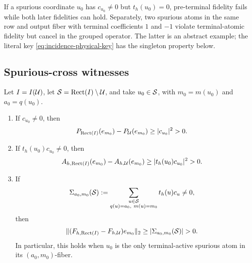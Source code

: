 \begin{example}
\label{ex:incidence-strict-hierarchy}
If a spurious coordinate \(u_0\) has \(c_{u_0}\ne0\) but
\(t_h(u_0)=0\), pre-terminal fidelity fails while both later fidelities can
hold.  Separately, two spurious atoms in the same row and output fiber with
terminal coefficients \(1\) and \(-1\) violate terminal-atomic fidelity
but cancel in the grouped operator.  The latter is an abstract example;
the literal key \eqref{eq:incidence-physical-key} has the singleton
property below.
\end{example}

\subsection{Spurious-cross witnesses}

\begin{proposition}
\label{prop:incidence-spurious-cross-witness}
Let \(I=I(\mathcal U)\), let \(\mathcal S=\operatorname{Rect}(I)\setminus\mathcal U\), and take
\(u_0\in\mathcal S\), with \(m_0=m(u_0)\) and \(a_0=q(u_0)\).
\begin{enumerate}[label=\textup{(\alph*)},leftmargin=2.7em]
 \item If \(c_{u_0}\ne0\), then
       \begin{equation}
        P_{\operatorname{Rect}(I)}(e_{m_0})-P_{\mathcal U}(e_{m_0})
        \ge |c_{u_0}|^2>0.
        \label{eq:incidence-preterminal-witness}
       \end{equation}
 \item If \(t_h(u_0)c_{u_0}\ne0\), then
       \begin{equation}
        A_{h,\operatorname{Rect}(I)}(e_{m_0})-A_{h,\mathcal U}(e_{m_0})
        \ge |t_h(u_0)c_{u_0}|^2>0.
        \label{eq:incidence-terminal-witness}
       \end{equation}
 \item If
       \begin{equation}
        \Sigma_{a_0,m_0}(\mathcal S)
        :=\sum_{\substack{u\in\mathcal S\\q(u)=a_0,\ m(u)=m_0}}
                    t_h(u)c_u\ne0,
        \label{eq:incidence-spurious-fiber-sum}
       \end{equation}
       then
       \begin{equation}
        \|(F_{h,\Rect(I)}-F_{h,\cU})e_{m_0}\|_2
        \ge |\Sigma_{a_0,m_0}(\cS)|>0.
        \label{eq:incidence-grouped-witness}
       \end{equation}
       In particular, this holds when \(u_0\) is the only terminal-active
       spurious atom in its \((a_0,m_0)\)-fiber.
\end{enumerate}
\end{proposition}

